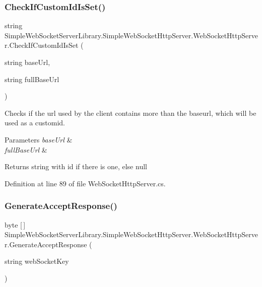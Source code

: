 \subsubsection{\texorpdfstring{Check\+If\+Custom\+Id\+Is\+Set()}{CheckIfCustomIdIsSet()}}
{\footnotesize\ttfamily string Simple\+Web\+Socket\+Server\+Library.\+Simple\+Web\+Socket\+Http\+Server.\+Web\+Socket\+Http\+Server.\+Check\+If\+Custom\+Id\+Is\+Set (\begin{DoxyParamCaption}\item[{string}]{base\+Url,  }\item[{string}]{full\+Base\+Url }\end{DoxyParamCaption})}



Checks if the url used by the client contains more than the baseurl, which will be used as a customid. 


\begin{DoxyParams}{Parameters}
{\em base\+Url} & \\
\hline
{\em full\+Base\+Url} & \\
\hline
\end{DoxyParams}
\begin{DoxyReturn}{Returns}
string with id if there is one, else null
\end{DoxyReturn}


Definition at line 89 of file Web\+Socket\+Http\+Server.\+cs.

\mbox{\label{class_simple_web_socket_server_library_1_1_simple_web_socket_http_server_1_1_web_socket_http_server_a069af261c2eea78d3c3b75a39f97ea15}} 
\subsubsection{\texorpdfstring{Generate\+Accept\+Response()}{GenerateAcceptResponse()}}
{\footnotesize\ttfamily byte \mbox{[}$\,$\mbox{]} Simple\+Web\+Socket\+Server\+Library.\+Simple\+Web\+Socket\+Http\+Server.\+Web\+Socket\+Http\+Server.\+Generate\+Accept\+Response (\begin{DoxyParamCaption}\item[{string}]{web\+Socket\+Key }\end{DoxyParamCaption})}



